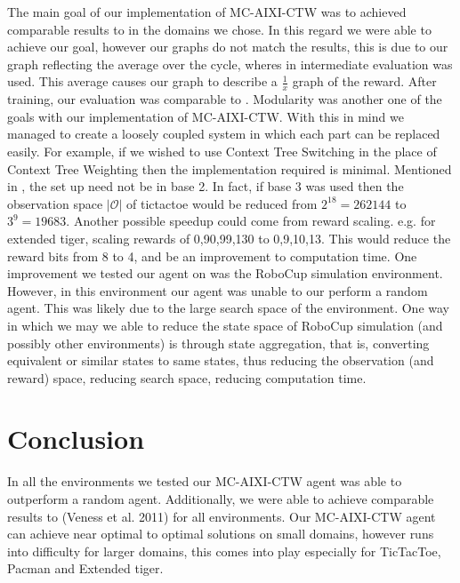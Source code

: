 \documentclass{article}
\theoremstyle{definition}
\newtheorem{primary statistics}[definition]{Primary Statistics}
\newtheorem{auxiliary statistics}[definition]{Auxiliary Statistics}
\begin{document}
The main goal of our implementation of MC-AIXI-CTW was to achieved comparable results to \citep{veness2011monte} in the domains we chose. In this regard we were able to achieve our goal, however our graphs do not match the \citep{veness2011monte} results, this is due to our graph reflecting the average over the cycle, wheres in \citep{veness2011monte} intermediate evaluation was used. This average causes our graph to describe a $\frac{1}{x}$ graph of the reward. After training, our evaluation was comparable to \citep{veness2011monte}. Modularity was another one of the goals with our implementation of MC-AIXI-CTW. With this in mind we managed to create a loosely coupled system in which each part can be replaced easily. For example, if we wished to use Context Tree Switching \citep{veness2012context} in the place of Context Tree Weighting then the implementation required is minimal. Mentioned in \citep{veness2011monte}, the set up need not be in base 2. In fact, if base 3 was used then the observation space $|\mathcal{O}|$ of tictactoe would be reduced from $2^{18}=262144$ to $3^9 = 19683$. Another possible speedup could come from reward scaling.  e.g. for extended tiger, scaling rewards of 0,90,99,130 to 0,9,10,13. This would reduce the reward bits from 8 to 4, and be an improvement to computation time. One improvement we tested our agent on was the RoboCup simulation environment. However, in this environment our agent was unable to our perform a random agent. This was likely due to the large search space of the environment. One way in which we may we able to reduce the state space of RoboCup simulation (and possibly other environments) is through state aggregation, that is, converting equivalent or similar states to same states, thus reducing the observation (and reward) space, reducing search space, reducing computation time.


\section{Conclusion}
In all the environments we tested our MC-AIXI-CTW agent was able to outperform a random agent. Additionally, we were able to achieve comparable results to (Veness et al. 2011) for all environments. Our MC-AIXI-CTW agent can achieve near optimal to optimal solutions on small domains, however runs into difficulty for larger domains, this comes into play especially for TicTacToe, Pacman and Extended tiger.




  
  
  

\printbibliography
\end{document}
